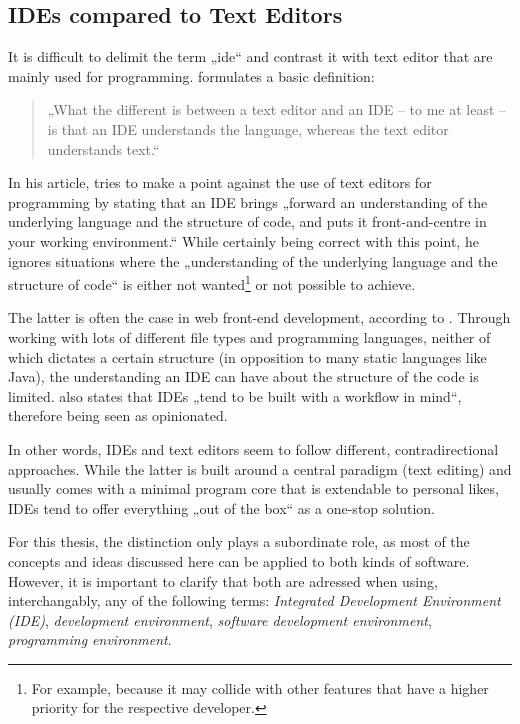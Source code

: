 \subsection{IDEs compared to Text
Editors}\label{ides-compared-to-text-editors}

It is difficult to delimit the term „\acl{ide}“ and contrast it with
text editor that are mainly used for programming. 
formulates a basic definition:

\begin{quote}
„What the different is between a text editor and an IDE – to me at least
– is that an IDE understands the language, whereas the text editor
understands text.“ \citeyear{reynolds}
\end{quote}

In his article,  tries to make a point against the
use of text editors for programming by stating that an IDE brings
„forward an understanding of the underlying language and the structure
of code, and puts it front-and-centre in your working environment.“
\citeyear{reynolds} While certainly being correct with this point, he
ignores situations where the „understanding of the underlying language
and the structure of code“ is either not
wanted\footnote{For example, because it may collide with other features that have a higher priority for the respective developer.}
or not possible to achieve.

The latter is often the case in web front-end development, according to
. Through working with lots of different file types
and programming languages, neither of which dictates a certain structure
(in opposition to many static languages like Java), the understanding an
IDE can have about the structure of the code is limited.
 also states that IDEs „tend to be built with a workflow
in mind“, therefore being seen as opinionated.

In other words, IDEs and text editors seem to follow different,
contradirectional approaches. While the latter is built around a central
paradigm (text editing) and usually comes with a minimal program core
that is extendable to personal likes, IDEs tend to offer everything „out
of the box“ as a one-stop solution.

For this thesis, the distinction only plays a subordinate role, as most
of the concepts and ideas discussed here can be applied to both kinds of
software. However, it is important to clarify that both are adressed
when using, interchangably, any of the following terms: \emph{Integrated
Development Environment (IDE)}, \emph{development environment},
\emph{software development environment}, \emph{programming environment}.

